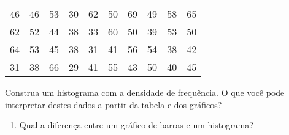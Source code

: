 \documentclass[]{article}
\providecommand{\tightlist}{%
  \setlength{\itemsep}{0pt}\setlength{\parskip}{0pt}}
\begin{document}
\begin{table}[H]
\centering
\begin{tabular}{cccccccccc}
\cline{1-10}
46 & 46 & 53 & 30 & 62 & 50 & 69 & 49 & 58 & 65 \\
62 & 52 & 44 & 38 & 33 & 60 & 50 & 39 & 53 & 50 \\
64 & 53 & 45 & 38 & 31 & 41 & 56 & 54 & 38 & 42 \\
31 & 38 & 66 & 29 & 41 & 55 & 43 & 50 & 40 & 45 \\ \cline{1-10}
\end{tabular}
\end{table}

Construa um histograma com a densidade de frequência. O que você pode
interpretar destes dados a partir da tabela e dos gráficos?

\begin{enumerate}
\def\labelenumi{\arabic{enumi}.}
\setcounter{enumi}{7}
\tightlist
\item
  Qual a diferença entre um gráfico de barras e um histograma?
\end{enumerate}
\end{document}
